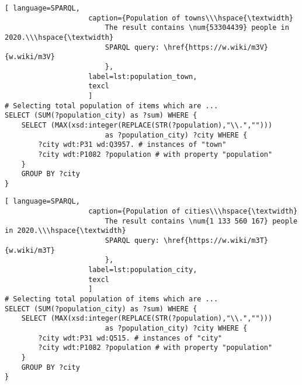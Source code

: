\begin{lstlisting}[ language=SPARQL, 
                    caption={Population of towns\\\hspace{\textwidth}
                        The result contains \num{53304439} people in 2020.\\\hspace{\textwidth}
                        SPARQL query: \href{https://w.wiki/m3V}{w.wiki/m3V}
                        },
                    label=lst:population_town,
                    texcl 
                    ]
# Selecting total population of items which are ...
SELECT (SUM(?population_city) as ?sum) WHERE {                    
	SELECT (MAX(xsd:integer(REPLACE(STR(?population),"\\.",""))) 
						as ?population_city) ?city WHERE {
		?city wdt:P31 wd:Q3957.	# instances of "town"
		?city wdt:P1082 ?population # with property "population"                                  
	}
	GROUP BY ?city
}
\end{lstlisting}%


\newpage

\begin{lstlisting}[ language=SPARQL, 
                    caption={Population of cities\\\hspace{\textwidth}
                        The result contains \num{1 133 560 167} people in 2020.\\\hspace{\textwidth}
                        SPARQL query: \href{https://w.wiki/m3T}{w.wiki/m3T}
                        },
                    label=lst:population_city,
                    texcl 
                    ]
# Selecting total population of items which are ...
SELECT (SUM(?population_city) as ?sum) WHERE {                    
	SELECT (MAX(xsd:integer(REPLACE(STR(?population),"\\.",""))) 
						as ?population_city) ?city WHERE {
		?city wdt:P31 wd:Q515. # instances of "city"
		?city wdt:P1082 ?population # with property "population"
	}
	GROUP BY ?city
}
\end{lstlisting}%

